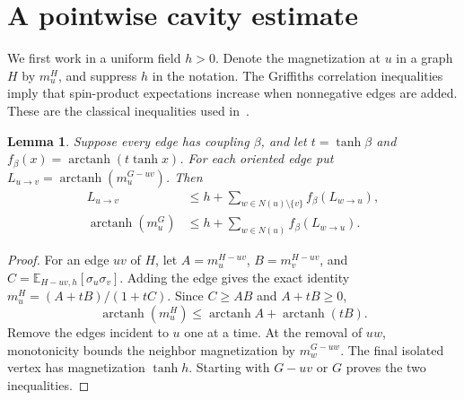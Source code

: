 \documentclass[11pt]{article}
\newtheorem{lemma}[theorem]{Lemma}
\theoremstyle{remark}
\newcommand{\E}{\mathbb E}
\newcommand{\arctanh}{\operatorname{arctanh}}
\begin{document}
\section{A pointwise cavity estimate}

We first work in a uniform field $h>0$. Denote the magnetization at $u$
in a graph $H$ by $m_u^H$, and suppress $h$ in the notation.
The Griffiths correlation inequalities imply that spin-product
expectations increase when nonnegative edges are added.
These are the classical inequalities used in~\cite[Section~4]{CDKP}.

\begin{lemma}\label{lem:cavity}
Suppose every edge has coupling $\beta$, and let
$t=\tanh\beta$ and $f_\beta(x)=\arctanh(t\tanh x)$.
For each oriented edge put
$L_{u\to v}=\arctanh(m_u^{G-uv})$. Then
\begin{align}
 L_{u\to v}
    &\le h+\sum_{w\in N(u)\setminus\{v\}}f_\beta(L_{w\to u}),
       \label{eq:cavity}\\
 \arctanh(m_u^G)
    &\le h+\sum_{w\in N(u)}f_\beta(L_{w\to u}).
       \label{eq:root}
\end{align}
\end{lemma}
\begin{proof}
For an edge $uv$ of $H$, let
$A=m_u^{H-uv}$, $B=m_v^{H-uv}$, and
$C=\E_{H-uv,h}[\sigma_u\sigma_v]$.
Adding the edge gives the exact identity
$m_u^H=(A+tB)/(1+tC)$.
Since $C\ge AB$ and $A+tB\ge0$,
\[
 \arctanh(m_u^H)\le\arctanh A+\arctanh(tB).
\]
Remove the edges incident to $u$ one at a time.
At the removal of $uw$, monotonicity bounds the neighbor
magnetization by $m_w^{G-uw}$.
The final isolated vertex has magnetization $\tanh h$.
Starting with $G-uv$ or $G$ proves the two inequalities.
\end{proof}
\end{document}
